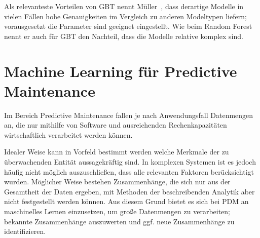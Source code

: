 Als relevanteste Vorteilen von GBT nennt Müller~\cite{Muller.2017}, dass derartige Modelle in vielen Fällen hohe Genauigkeiten im Vergleich zu anderen Modeltypen liefern; vorausgesetzt die Parameter sind geeignet eingestellt. Wie beim Random Forest nennt er auch für GBT den Nachteil, dass die Modelle relative komplex sind.

\section{Machine Learning für Predictive Maintenance}
\label{sec:machine_learning_fuer_pdm}
Im Bereich Predictive Maintenance fallen je nach Anwendungsfall Datenmengen an, die nur mithilfe von Software und ausreichenden Rechenkapazitäten wirtschaftlich verarbeitet werden können. 

Idealer Weise kann in Vorfeld bestimmt werden welche Merkmale der zu überwachenden Entität aussagekräftig sind. In komplexen Systemen ist es jedoch häufig nicht möglich auszuschließen, dass alle relevanten Faktoren berücksichtigt wurden. Möglicher Weise bestehen Zusammenhänge, die sich nur aus der Gesamtheit der Daten ergeben, mit Methoden der beschreibenden Analytik aber nicht festgestellt werden können. Aus diesem Grund bietet es sich bei PDM an maschinelles Lernen einzusetzen, um große Datenmengen zu verarbeiten; bekannte Zusammenhänge auszuwerten und ggf. neue Zusammenhänge zu identifizieren.

